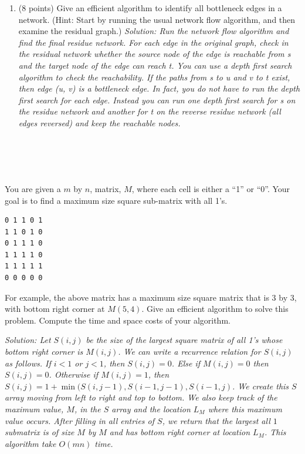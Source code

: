 \documentclass[11pt]{article}
\newcommand{\ans}[1]{\emph{Solution: #1}}
\begin{document}
\begin{enumerate}
\begin{enumerate}
\pagebreak

\item (8 points) Give an efficient algorithm to identify all bottleneck edges in a network. (Hint: Start by running the usual network flow algorithm, and then examine the residual graph.) \ans{Run the network flow algorithm and find the final residue network. For each edge in the original graph, check in the residual network whether the source node of the edge is reachable from s and the target node of the edge can reach t. You can use a depth first search algorithm to check the reachability. If the paths from s to u and v to t exist, then edge (u, v) is a bottleneck edge. In fact, you do not have to run the depth first search for each edge. Instead you can run one depth first search for s on the residue network and another for t on the reverse residue network (all edges reversed) and keep the reachable nodes.
} \\ \ \\ \ \\ \ \\ \ \\

\end{enumerate}





You are given a $m$ by $n$, matrix, $M$, where each cell is either a ``1''  or ``0''.    Your goal is to find a maximum size square sub-matrix with all 1's.   

\begin{verbatim}
0 1 1 0 1
1 1 0 1 0
0 1 1 1 0
1 1 1 1 0
1 1 1 1 1
0 0 0 0 0
\end{verbatim}

For example, the above matrix has a maximum size square matrix that is 3 by 3, with bottom right corner at $M(5,4)$.  Give an efficient algorithm to solve this problem.  Compute the time and space costs of your algorithm.

\ans{Let $S(i,j)$ be the size of the largest square matrix of all 1's whose bottom right corner is $M(i,j)$.  We can write a recurrence relation for $S(i,j)$ as follows.  If $i<1$ or $j<1$, then $S(i,j) = 0$.  Else if $M(i,j) = 0$ then $S(i,j) = 0$.  Otherwise if $M(i,j) = 1$, then $S(i,j) = 1 + \min(S(i,j-1), S(i-1,j-1), S(i-1,j)$.  We create this $S$ array moving from left to right and top to bottom.   We also keep track of the maximum value, $M$, in the $S$ array and the location $L_{M}$ where this maximum value occurs.  After filling in all entries of $S$, we return that the largest all $1$ submatrix is of size $M$ by $M$ and has bottom right corner at location $L_{M}$.  This algorithm take $O(mn)$ time.}

 
 
 
 \extrapage


\end{enumerate}

  
  
 
  
\end{document}
